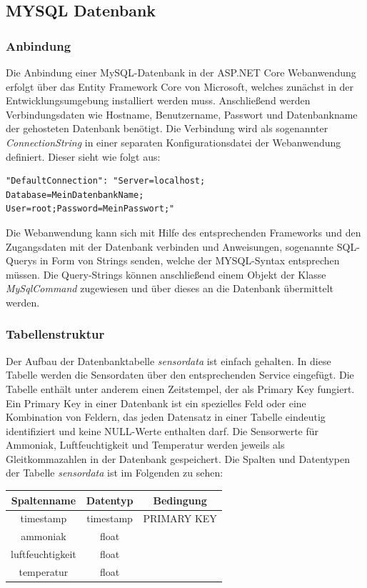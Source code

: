 \documentclass[conference]{IEEEtran}
\begin{document}
\subsection{MYSQL Datenbank}
\subsubsection{Anbindung}
Die Anbindung einer MySQL-Datenbank in der ASP.NET Core Webanwendung erfolgt über das Entity Framework Core von Microsoft, welches zunächst in der Entwicklungsumgebung installiert werden muss. Anschließend werden Verbindungsdaten wie Hostname, Benutzername, Passwort und Datenbankname der gehosteten Datenbank benötigt. Die Verbindung wird als sogenannter \textit{ConnectionString} in einer separaten Konfigurationsdatei der Webanwendung definiert. Dieser sieht wie folgt aus: \\
\begin{verbatim}
"DefaultConnection": "Server=localhost;
Database=MeinDatenbankName;
User=root;Password=MeinPasswort;"
\end{verbatim}
Die Webanwendung kann sich mit Hilfe des entsprechenden Frameworks und den Zugangsdaten mit der Datenbank verbinden und Anweisungen, sogenannte SQL-Querys in Form von Strings senden, welche der MYSQL-Syntax entsprechen müssen. Die Query-Strings können anschließend einem Objekt der Klasse \textit{MySqlCommand} zugewiesen und über dieses an die Datenbank übermittelt werden.
\subsubsection{Tabellenstruktur}
Der Aufbau der Datenbanktabelle \textit{sensordata} ist einfach gehalten. In diese Tabelle werden die Sensordaten über den entsprechenden Service eingefügt. Die Tabelle enthält unter anderem einen Zeitstempel, der als Primary Key fungiert. Ein Primary Key in einer Datenbank ist ein spezielles Feld oder eine Kombination von Feldern, das jeden Datensatz in einer Tabelle eindeutig identifiziert und keine NULL-Werte enthalten darf. Die Sensorwerte für Ammoniak, Luftfeuchtigkeit und Temperatur werden jeweils als Gleitkommazahlen in der Datenbank gespeichert. Die Spalten und Datentypen der Tabelle \textit{sensordata} ist im Folgenden zu sehen:
\begin{table}[h!]
    \centering
    \begin{tabular}{|c|c|c|}
        \hline
        \textbf{Spaltenname} & \textbf{Datentyp}  & \textbf{Bedingung} \\
        \hline
        timestamp & timestamp & PRIMARY KEY \\
        \hline
        ammoniak & float & \\
        \hline
        luftfeuchtigkeit & float &  \\
        \hline
        temperatur & float & \\
        \hline
    \end{tabular}
    \label{tab:sensordata}
\end{table}
\end{document}
